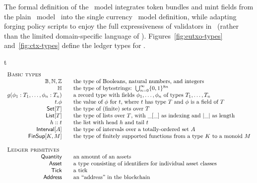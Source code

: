 The formal definition of the \EUTXOma\ model integrates token bundles and mint fields from the plain \UTXOma\ model~\cite{plain-multicurrency} into the single currency \EUTXO\ model definition, while adapting forging policy scripts to enjoy the full expressiveness of validators in \EUTXO\ (rather than the limited domain-specific language of \UTXOma). Figures~\ref{fig:eutxo-types} and~\ref{fig:ctx-types} define the ledger types for \EUTXOma.
%
%
\begin{ruledfigure}{t}
  \begin{displaymath}
    \begin{array}{rll}
      \multicolumn{3}{l}{\textsc{Basic types}}\\
     \B, \N, \Z && \mbox{the type of Booleans, natural numbers, and integers}\\
      \H{} && \mbox{the type of bytestrings: } \bigcup_{n=0}^{\infty}\{0,1\}^{8n}\\g
      (\phi_1 : T_1, \ldots, \phi_n : T_n) && \mbox{a record type with fields $\phi_1, \ldots, \phi_n$ of types $T_1, \ldots, T_n$}\\
      t.\phi && \mbox{the value of $\phi$ for $t$, where $t$ has type $T$ and $\phi$ is a field of $T$}\\
      \Set{T} && \mbox{the type of (finite) sets over $T$}\\
      \List{T} && \mbox{the type of lists over $T$, with $\_[\_]$ as indexing and $|\_|$ as length}\\
      h::t && \mbox{the list with head $h$ and tail $t$}\\
      \Interval{A} && \mbox{the type of intervals over a totally-ordered set $A$}\\
      \FinSup{K}{M} && \mbox{the type of finitely supported functions from a type $K$ to a monoid $M$}\\
      \\
      \multicolumn{3}{l}{\textsc{Ledger primitives}}\\
      \Quantity && \mbox{an amount of an assets}\\
      \Asset && \mbox{a type consisting of identifiers for individual asset classes}\\
      \Tick && \mbox{a tick}\\
      \Address && \mbox{an ``address'' in the blockchain}\\

\end{array}
\end{displaymath}
\end{ruledfigure}
